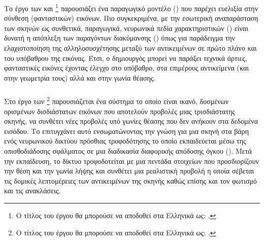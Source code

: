 Το έργο των  και \footnote{Ο τίτλος του έργου θα μπορούσε να αποδοθεί στα Ελληνικά ως: .}\cite{niemeyer2021giraffe} παρουσιάζει ένα παραγωγικό μοντέλο () που παρέχει ευελιξία στην σύνθεση (φανταστικών) εικόνων. Πιο συγκεκριμένα, με την εσωτερική αναπαράσταση των σκηνών ως συνθετικά, παραγωγικά, νευρωνικά πεδία χαρακτηριστικών () είναι δυνατή η απόπλεξη των παραγόντων διακύμανσης () όπως για παράδειγμα την ελαχιστοποίηση της αλληλοσυσχέτησης μεταξύ των αντικειμένων σε πρώτο πλάνο και του υπόβαθρου της εικόνας. Έτσι, ο δημιουργός μπορεί να παράξει τεχνικά άρτιες, φανταστικές εικόνες έχοντας έλεγχο στο υπόβαθρο, στα επιμέρους αντικείμενα (και στην γεωμετρία τους) αλλά και στην γωνία θέασης.

\subsubsection{}

Στο έργο των  \footnote{Ο τίτλος του έργου θα μπορούσε να αποδοθεί στα Ελληνικά ως: .}\cite{mildenhall2020nerf} παρουσιάζεται ένα σύστημα το οποίο είναι ικανό, δοσμένων ορισμένων δισδιάστατων εικόνων που αποτελούν προβολές μιας τρισδιάστατης σκηνής, να συνθέτει νέες προβολές υπό γωνίες θέασης που δεν ανήκουν στα δεδομένα εισόδου. Το επιτυγχάνει αυτό ενσωματώνοντας την γνώση για μια σκηνή στα βάρη ενός νευρωνικού δικτύου πρόσθιας τροφοδότησης το οποίο εκπαιδεύεται μέσω της οπισθοδιάδοσης σφάλματος σε μια διαδικασία διαφορικής απόδοσης όγκου (). Μετά την εκπαίδευση, το δίκτυο τροφοδοτείται με μια πεντάδα στοιχείων που προσδιορίζουν την θέση και την γωνία λήψης και συνθέτει μια ρεαλιστική προβολή η οποία σέβεται τις δομικές λεπτομέρειες των αντικειμένων της σκηνής καθώς επίσης και τον φωτισμό και τις ανακλάσεις.

